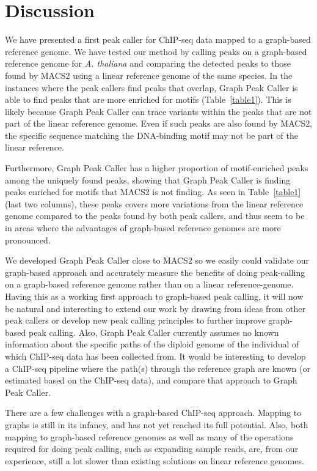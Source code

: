 \documentclass[10pt,letterpaper]{article}
\begin{document}
\section*{Discussion}
We have presented a first peak caller for ChIP-seq data mapped to a graph-based reference genome. We have tested our method by calling peaks on a graph-based reference genome for \emph{A. thaliana} and comparing the detected peaks to those found by MACS2 using a linear reference genome of the same species. In the instances where the peak callers find peaks that overlap, Graph Peak Caller is able to find peaks that are more enriched for motifs (Table~\ref{table1}). This is likely because Graph Peak Caller can trace variants within the peaks that are not part of the linear reference genome. Even if such peaks are also found by MACS2, the specific sequence matching the DNA-binding motif may not be part of the linear reference.

Furthermore, Graph Peak Caller has a higher proportion of motif-enriched peaks among the uniquely found peaks, showing that Graph Peak Caller is finding peaks enriched for motifs that MACS2 is not finding. As seen in Table~\ref{table1} (last two columns), these peaks covers more variations from the linear reference genome compared to the peaks found by both peak callers, and thus seem to be in areas where the advantages of graph-based reference genomes are more pronounced. 

We developed Graph Peak Caller close to MACS2 so we easily could validate our graph-based approach and accurately measure the benefits of doing peak-calling on a graph-based reference genome rather than on a linear reference-genome. Having this as a working first approach to graph-based peak calling, it will now be natural and interesting  to extend our work by drawing from ideas from other peak callers or develop new peak calling principles to further improve graph-based peak calling. Also, Graph Peak Caller currently assumes no known information about the specific paths of the diploid genome of the individual of which ChIP-seq data has been collected from. It would be interesting to develop a ChIP-seq pipeline where the path(s) through the reference graph are known (or estimated based on the ChIP-seq data), and compare that approach to Graph Peak Caller.

There are a few challenges with a graph-based ChIP-seq approach. Mapping to graphs is still in its infancy, and has not yet reached its full potential. Also, both mapping to graph-based reference genomes as well as many of the operations required for doing peak calling, such as expanding sample reads, are, from our experience, still a lot slower than existing solutions on linear reference genomes. 
\end{document}

